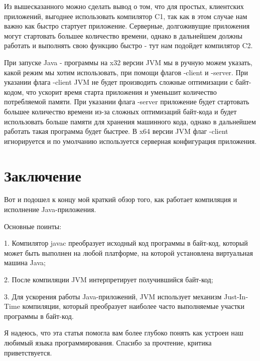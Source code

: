 \documentclass[]{scrartcl}
\begin{document}
Из вышесказанного можно сделать вывод о том, что для простых, клиентских приложений, выгоднее использовать компилятор C1, так как в этом случае нам важно как быстро стартует приложение. Серверные, долгоживущие приложения могут стартовать большее количество времени, однако в дальнейшем должны работать и выполнять свою функцию быстро - тут нам подойдет компилятор C2.

При запуске Java - программы на x32 версии JVM мы в ручную можем указать, какой режим мы хотим использовать, при помощи флагов -client и -server. При указании флага -client JVM не будет производить сложные оптимизации с байт-кодом, что ускорит время старта приложения и уменьшит количество потребляемой памяти. При указании флага -server приложение будет стартовать большее количество времени из-за сложных оптимизаций байт-кода и будет использовать больше памяти для хранения машинного кода, однако в дальнейшем работать такая программа будет быстрее. В x64 версии JVM флаг -client игнорируется и по умолчанию используется серверная конфигурация приложения.

\section{Заключение}

Вот и подошел к концу мой краткий обзор того, как работает компиляция и исполнение Java-приложения. 

Основные поинты:

1. Компилятор javac преобразует исходный код программы в байт-код, который может быть выполнен на любой платформе, на которой установлена виртуальная машина Java;

2. После компиляции JVM интерпретирует получившийся байт-код;

3. Для ускорения работы Java-приложений, JVM использует механизм Just-In-Time компиляции, который преобразует наиболее часто выполняемые участки программы в байт-код.

Я надеюсь, что эта статья помогла вам более глубоко понять как устроен наш любимый языка программирования. Спасибо за прочтение, критика приветствуется.
\end{document}
